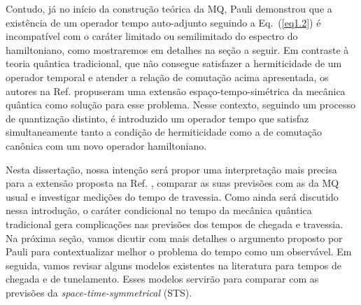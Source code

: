      Contudo, já no início da construção teórica da MQ, Pauli demonstrou que a existência de um operador tempo auto-adjunto seguindo a Eq.~(\ref{eq1.2}) é incompatível com o caráter limitado ou semilimitado do espectro do hamiltoniano, como mostraremos em detalhes na seção a seguir. Em contraste à teoria quântica tradicional, que não consegue satisfazer a hermiticidade de um operador temporal e atender a relação de comutação acima apresentada, os autores na Ref. \cite{Dias} propuseram uma extensão espaço-tempo-simétrica da mecânica quântica como solução para esse problema. Nesse contexto, seguindo um processo de quantização distinto, é introduzido um operador tempo que satisfaz simultaneamente tanto a condição de hermiticidade como a de comutação canônica com um novo operador hamiltoniano.
    
    Nesta dissertação, nossa intenção será propor uma interpretação mais precisa para a extensão proposta na Ref. \cite{Dias}, comparar as suas previsões com as da MQ usual e investigar medições do tempo de travessia. Como ainda será discutido nessa introdução, o caráter condicional no tempo da mecânica quântica tradicional gera complicações nas previsões dos tempos de chegada e travessia. Na próxima seção, vamos dicutir com mais detalhes o argumento proposto por Pauli para contextualizar melhor o problema do tempo como um observável. Em seguida, vamos revisar alguns modelos existentes na literatura para tempos de chegada e de tunelamento. Esses modelos servirão para comparar com as previsões da \textit{space-time-symmetrical} (STS). 





 
 